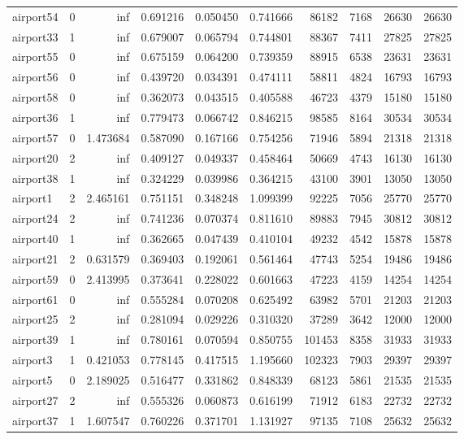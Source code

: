\documentclass[../../../thesis.tex]{subfiles}
\begin{document}
\begin{longtable}{|l|r|r|r|r|r|r|r|r|r|}
airport54 & 0 & inf & 0.691216 & 0.050450 & 0.741666 & 86182 & 7168 & 26630 & 26630 \\
airport33 & 1 & inf & 0.679007 & 0.065794 & 0.744801 & 88367 & 7411 & 27825 & 27825 \\
airport55 & 0 & inf & 0.675159 & 0.064200 & 0.739359 & 88915 & 6538 & 23631 & 23631 \\
airport56 & 0 & inf & 0.439720 & 0.034391 & 0.474111 & 58811 & 4824 & 16793 & 16793 \\
airport58 & 0 & inf & 0.362073 & 0.043515 & 0.405588 & 46723 & 4379 & 15180 & 15180 \\
airport36 & 1 & inf & 0.779473 & 0.066742 & 0.846215 & 98585 & 8164 & 30534 & 30534 \\
airport57 & 0 & 1.473684 & 0.587090 & 0.167166 & 0.754256 & 71946 & 5894 & 21318 & 21318 \\
airport20 & 2 & inf & 0.409127 & 0.049337 & 0.458464 & 50669 & 4743 & 16130 & 16130 \\
airport38 & 1 & inf & 0.324229 & 0.039986 & 0.364215 & 43100 & 3901 & 13050 & 13050 \\
airport1 & 2 & 2.465161 & 0.751151 & 0.348248 & 1.099399 & 92225 & 7056 & 25770 & 25770 \\
airport24 & 2 & inf & 0.741236 & 0.070374 & 0.811610 & 89883 & 7945 & 30812 & 30812 \\
airport40 & 1 & inf & 0.362665 & 0.047439 & 0.410104 & 49232 & 4542 & 15878 & 15878 \\
airport21 & 2 & 0.631579 & 0.369403 & 0.192061 & 0.561464 & 47743 & 5254 & 19486 & 19486 \\
airport59 & 0 & 2.413995 & 0.373641 & 0.228022 & 0.601663 & 47223 & 4159 & 14254 & 14254 \\
airport61 & 0 & inf & 0.555284 & 0.070208 & 0.625492 & 63982 & 5701 & 21203 & 21203 \\
airport25 & 2 & inf & 0.281094 & 0.029226 & 0.310320 & 37289 & 3642 & 12000 & 12000 \\
airport39 & 1 & inf & 0.780161 & 0.070594 & 0.850755 & 101453 & 8358 & 31933 & 31933 \\
airport3 & 1 & 0.421053 & 0.778145 & 0.417515 & 1.195660 & 102323 & 7903 & 29397 & 29397 \\
airport5 & 0 & 2.189025 & 0.516477 & 0.331862 & 0.848339 & 68123 & 5861 & 21535 & 21535 \\
airport27 & 2 & inf & 0.555326 & 0.060873 & 0.616199 & 71912 & 6183 & 22732 & 22732 \\
airport37 & 1 & 1.607547 & 0.760226 & 0.371701 & 1.131927 & 97135 & 7108 & 25632 & 25632 \\

\end{longtable}
\end{document}
